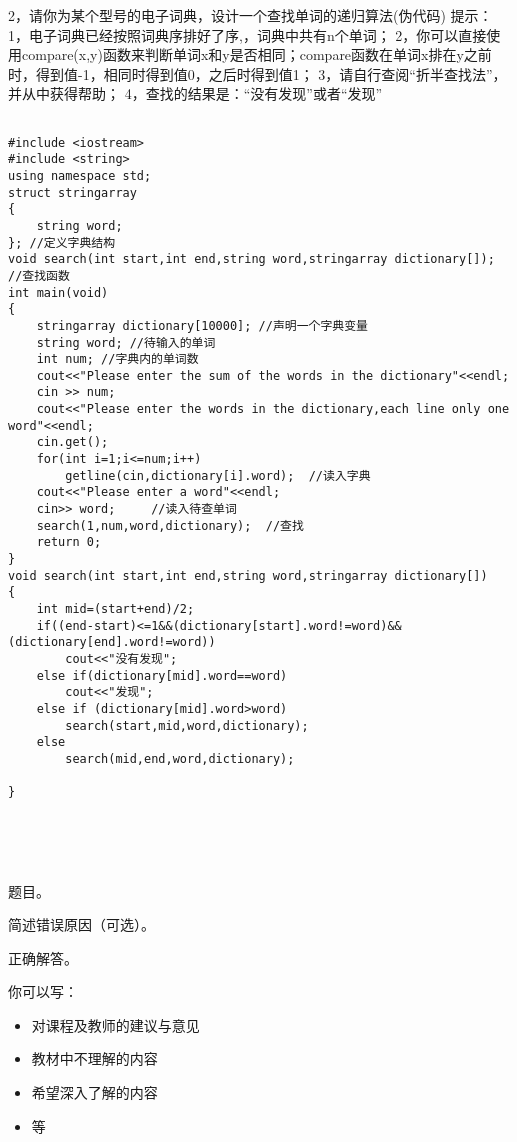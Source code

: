 \documentclass[11pt, a4paper, UTF8]{ctexart}
\begin{document}
\begin{problem}[2]
2，请你为某个型号的电子词典，设计一个查找单词的递归算法(伪代码)
提示：1，电子词典已经按照词典序排好了序,，词典中共有n个单词；
           2，你可以直接使用compare(x,y)函数来判断单词x和y是否相同；compare函数在单词x排在y之前时，得到值-1，相同时得到值0，之后时得到值1；
           3，请自行查阅“折半查找法”，并从中获得帮助；
           4，查找的结果是：“没有发现”或者“发现”
\end{problem}

\begin{solution}
\begin{lstlisting}

#include <iostream>
#include <string>
using namespace std;
struct stringarray
{
    string word;
}; //定义字典结构
void search(int start,int end,string word,stringarray dictionary[]); //查找函数
int main(void)
{
    stringarray dictionary[10000]; //声明一个字典变量
    string word; //待输入的单词
    int num; //字典内的单词数
    cout<<"Please enter the sum of the words in the dictionary"<<endl;
    cin >> num;
    cout<<"Please enter the words in the dictionary,each line only one word"<<endl;
    cin.get();
    for(int i=1;i<=num;i++)
        getline(cin,dictionary[i].word);  //读入字典
    cout<<"Please enter a word"<<endl;
    cin>> word;     //读入待查单词
    search(1,num,word,dictionary);  //查找
    return 0;
}
void search(int start,int end,string word,stringarray dictionary[])
{
    int mid=(start+end)/2;
    if((end-start)<=1&&(dictionary[start].word!=word)&&(dictionary[end].word!=word))
        cout<<"没有发现";
    else if(dictionary[mid].word==word)
        cout<<"发现";
    else if (dictionary[mid].word>word)
        search(start,mid,word,dictionary);
    else
        search(mid,end,word,dictionary);
    
}





\end{lstlisting}
\end{solution}
\begincorrection	%

\begin{problem}[题号]
  题目。
\end{problem}

\begin{cause}
  简述错误原因（可选）。
\end{cause}

\begin{revision}
  正确解答。
\end{revision}
\beginfb	%

你可以写：
\begin{itemize}
  \item 对课程及教师的建议与意见
  \item 教材中不理解的内容
  \item 希望深入了解的内容
  \item 等
\end{itemize}
\end{document}
